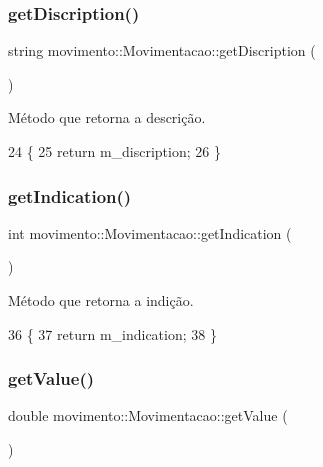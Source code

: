 \subsubsection{\texorpdfstring{get\+Discription()}{getDiscription()}}
{\footnotesize\ttfamily string movimento\+::\+Movimentacao\+::get\+Discription (\begin{DoxyParamCaption}{ }\end{DoxyParamCaption})}



Método que retorna a descrição. 


\begin{DoxyCode}
24     \{
25         \textcolor{keywordflow}{return} m\_discription;
26     \}
\end{DoxyCode}
\mbox{\label{classmovimento_1_1Movimentacao_a73adba299058efa36f3a40a864002d79}} 
\subsubsection{\texorpdfstring{get\+Indication()}{getIndication()}}
{\footnotesize\ttfamily int movimento\+::\+Movimentacao\+::get\+Indication (\begin{DoxyParamCaption}{ }\end{DoxyParamCaption})}



Método que retorna a indição. 


\begin{DoxyCode}
36     \{
37         \textcolor{keywordflow}{return} m\_indication;
38     \}
\end{DoxyCode}
\mbox{\label{classmovimento_1_1Movimentacao_acbd1a5baf62ce795e758b47a27ee4124}} 
\subsubsection{\texorpdfstring{get\+Value()}{getValue()}}
{\footnotesize\ttfamily double movimento\+::\+Movimentacao\+::get\+Value (\begin{DoxyParamCaption}{ }\end{DoxyParamCaption})}




